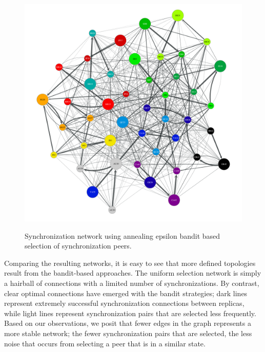 \begin{figure}
    \begin{center}
        \includegraphics[width=5in]{figures/ch06_b-annealing-epsilon-greedy-e5.pdf}
    \end{center}
    \renewcommand{\baselinestretch}{1}
    \small\normalsize

    \begin{quote}
        \caption[Annealing Epsilon Anti-Entropy Synchronization Network]{Synchronization network using annealing epsilon bandit based selection of synchronization peers.}
        \label{fig:ch06_annealing_epsilon_toplogy}
    \end{quote}
\end{figure}
\renewcommand{\baselinestretch}{2}
\small\normalsize

Comparing the resulting networks, it is easy to see that more defined topologies result from the bandit-based approaches.
The uniform selection network is simply a hairball of connections with a limited number of synchronizations.
By contrast, clear optimal connections have emerged with the bandit strategies; dark lines represent extremely successful synchronization connections between replicas, while light lines represent synchronization pairs that are selected less frequently.
Based on our observations, we posit that fewer edges in the graph represents a more stable network; the fewer synchronization pairs that are selected, the less noise that occurs from selecting a peer that is in a similar state.

